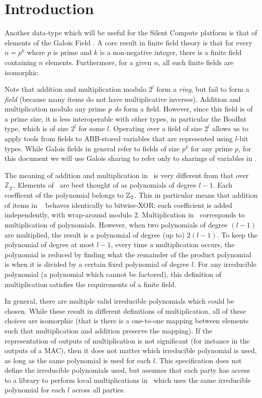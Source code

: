\section{Introduction}

Another data-type which will be useful for the Silent Compute platform
is that of elements of the Galois Field \GFtwol.
A core result in finite field theory is that for every 
$n = p^k$ where $p$ is prime and $k$ is a non-negative integer,
there is a finite field containing $n$ elements.
Furthermore, for a given $n$, all such finite fields are isomorphic.

Note that addition and multiplication modulo $2^l$ form a \emph{ring},
but fail to form a \emph{field} (because many items do not have
multiplicative inverses).
Addition and multiplication modulo any prime $p$ \emph{do} form a field.
However, since this field is of a prime size, it is less interoperable
with other types, in particular the BoolInt type, which is of size $2^l$ 
for some $l$.
Operating over a field of size $2^l$ allows us to apply tools from fields
to ABB-stored variables that are represented using $l$-bit types.
While Galois fields in general refer to fields of size $p^k$ for any prime $p$,
for this document we will use Galois sharing to refer only to sharings
of variables in \GFtwol.

The meaning of addition and multiplication in \GFtwol~is very different
from that over $\mathbb{Z}_{2^l}$.
Elements of \GFtwol~are best thought of as polynomials of degree $l-1$.
Each coefficent of the polynomial belongs to $\mathbb{Z}_2$. 
This in particular means that addition of items in \GFtwol~
behaves identically to bitwise-XOR:
each coefficient is added independently, with wrap-around modulo 2.
Multiplication in \GFtwol~corresponds to multiplication of polynomials.
However, when two polynomials of degree $(l-1)$ are multiplied,
the result is a polynomial of degree (up to) $2(l-1)$.
To keep the polynomial of degree at most $l-1$, every time a multiplication occurs, 
the polynomial is reduced by finding what the remainder of the product polynomial
is when it is divided by a certain fixed polynomial of degree $l$.
For any irreducible polynomial (a polynomial which cannot be factored),
this definition of multiplication satisfies the requirements of a finite field.

In general, there are multiple valid irreducible polynomials which could be chosen.
While these result in different definitions of multiplication, all of these choices
are isomorphic (that is there is a one-to-one mapping between elements
such that multiplication and addition preserve the mapping).
If the representation of outputs of multiplication is not significant
(for instance in the outputs of a MAC),
then it does not matter which irreducible polynomial is used,
as long as the same polynomial is used for each $l$.
This specification does not define the irreducible polynomials used,
but assumes that each party has access to a library to perform 
local multiplications in \GFtwol~which uses the same irreducible polynomial
for each $l$ across all parties.

